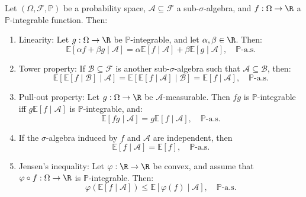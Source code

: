 \begin{thm}
Let $(\Omega,\mathcal{F},\mathbb{P})$ be a probability space, $\mathcal{A}\subseteq\mathcal{F}$ a sub-$\sigma$-algebra, and $f:\Omega\to\R$ a $\mathbb{P}$-integrable function. Then:
\begin{enumerate}[label=(\roman*)]
\item Linearity: Let $g:\Omega\to\R$ be $\mathbb{P}$-integrable, and let $\alpha,\beta\in\R$. Then:
\begin{equation}\label{eq:celin}
    \mathbb{E}[\alpha f +\beta g\mid\mathcal{A}]=\alpha\mathbb{E}[f\mid\mathcal{A}]+\beta\mathbb{E}[g\mid\mathcal{A}],\quad\textrm{$\mathbb{P}$-a.s.}
\end{equation}
\item Tower property: If $\mathcal{B}\subseteq\mathcal{F}$ is another sub-$\sigma$-algebra such that $\mathcal{A}\subseteq\mathcal{B}$, then:
\begin{equation}\label{eq:cetp}
    \mathbb{E}[\mathbb{E}[f\mid\mathcal{B}]\mid\mathcal{A}]=\mathbb{E}[\mathbb{E}[f\mid\mathcal{A}]\mid\mathcal{B}]=\mathbb{E}[f\mid\mathcal{A}],\quad\textrm{$\mathbb{P}$-a.s.}
\end{equation}
\item Pull-out property: Let $g:\Omega\to\R$ be $\mathcal{A}$-measurable. Then $fg$ is $\mathbb{P}$-integrable iff $g\mathbb{E}[f\mid\mathcal{A}]$ is $\mathbb{P}$-integrable, and:
\begin{equation}\label{eq:cepop}
    \mathbb{E}[fg\mid\mathcal{A}]=g\mathbb{E}[f\mid\mathcal{A}],\quad\textrm{$\mathbb{P}$-a.s.}
\end{equation}
\item If the $\sigma$-algebra induced by $f$ and $\mathcal{A}$ are independent, then
\begin{equation}\label{eq:ceind}
    \mathbb{E}[f\mid\mathcal{A}]=\mathbb{E}[f],\quad\textrm{$\mathbb{P}$-a.s.}
\end{equation}
\item Jensen's inequality: Let $\varphi:\R\to\R$ be convex, and assume that $\varphi\circ f:\Omega\to\R$ is $\mathbb{P}$-integrable. Then:
\begin{equation}\label{eq:cejens}
    \varphi\left(\mathbb{E}[f\mid\mathcal{A}]\right)\leq\mathbb{E}[\varphi(f)\mid\mathcal{A}],\quad\textrm{$\mathbb{P}$-a.s.}
\end{equation}
\end{enumerate}
\end{thm}

